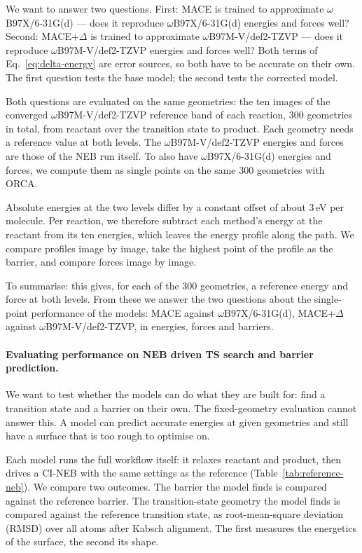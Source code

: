 We want to answer two questions. First: MACE is trained to approximate
$\omega$B97X/6-31G(d) --- does it reproduce $\omega$B97X/6-31G(d) energies and forces well?
Second: MACE+$\Delta$ is trained to approximate $\omega$B97M-V/def2-TZVP --- does
it reproduce $\omega$B97M-V/def2-TZVP energies and forces well? Both terms of
Eq.~\eqref{eq:delta-energy} are error sources, so both have to be
accurate on their own. The first question tests the base model; the
second tests the corrected model.

Both questions are evaluated on the same geometries: the ten images
of the converged $\omega$B97M-V/def2-TZVP reference band of each
reaction, 300 geometries in total, from reactant over the transition
state to product. Each geometry needs a reference value at both
levels. The $\omega$B97M-V/def2-TZVP energies and forces are those
of the NEB run itself. To also have $\omega$B97X/6-31G(d) energies
and forces, we compute them as single points on the same 300
geometries with ORCA.

Absolute energies at the two levels differ by a constant offset of
about 3\,eV per molecule. Per reaction, we therefore subtract each
method's energy at the reactant from its ten energies, which leaves
the energy profile along the path. We compare profiles image by image,
take the highest point of the profile as the barrier, and compare
forces image by image.

To summarise: this gives, for each of the 300 geometries, a reference
energy and force at both levels. From these we answer the two
questions about the single-point performance of the models: MACE
against \mbox{$\omega$B97X/6-31G(d)}, MACE+$\Delta$ against
\mbox{$\omega$B97M-V/def2-TZVP}, in energies, forces and barriers.

\paragraph{Evaluating performance on NEB driven TS search and barrier prediction.}
We want to test whether the models can do what they are built for: find a transition
state and a barrier on their own. The fixed-geometry evaluation cannot answer this. A model can predict accurate energies at
given geometries and still have a surface that is too rough to optimise on.

Each model runs the full workflow itself: it relaxes reactant and product,
then drives a CI-NEB with the same settings as the reference
(Table~\ref{tab:reference-neb}). We compare two outcomes. The barrier the
model finds is compared against the reference barrier. The transition-state geometry
the model finds is compared against the reference transition state, as
root-mean-square deviation (RMSD) over all atoms after Kabsch alignment. The first measures the energetics of the
surface, the second its shape.

